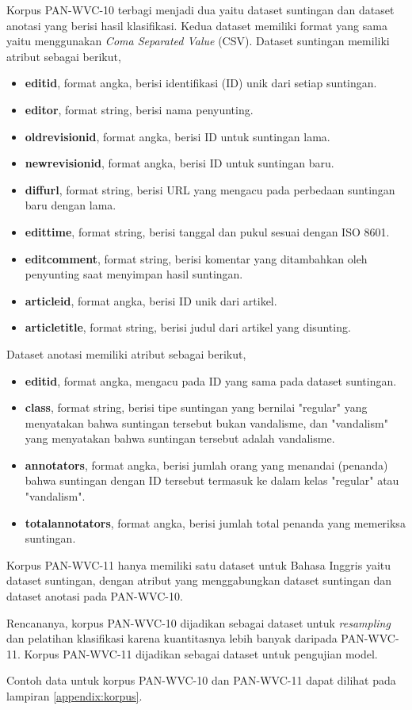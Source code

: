 Korpus PAN-WVC-10 terbagi menjadi dua yaitu dataset suntingan dan dataset anotasi yang berisi hasil klasifikasi.
Kedua dataset memiliki format yang sama yaitu menggunakan \textit{Coma Separated Value} (CSV).
Dataset suntingan memiliki atribut sebagai berikut,
\begin{itemize}
	\item \textbf{editid}, format angka, berisi identifikasi (ID) unik dari setiap suntingan.
	\item \textbf{editor}, format string, berisi nama penyunting.
	\item \textbf{oldrevisionid}, format angka, berisi ID untuk suntingan lama.
	\item \textbf{newrevisionid}, format angka, berisi ID untuk suntingan baru.
	\item \textbf{diffurl}, format string, berisi URL yang mengacu pada perbedaan suntingan baru dengan lama.
	\item \textbf{edittime}, format string, berisi tanggal dan pukul sesuai dengan ISO 8601.
	\item \textbf{editcomment}, format string, berisi komentar yang ditambahkan oleh penyunting saat menyimpan hasil suntingan.
	\item \textbf{articleid}, format angka, berisi ID unik dari artikel.
	\item \textbf{articletitle}, format string, berisi judul dari artikel yang disunting.
\end{itemize}

Dataset anotasi memiliki atribut sebagai berikut,
\begin{itemize}
	\item \textbf{editid}, format angka, mengacu pada ID yang sama pada dataset suntingan.
	\item \textbf{class}, format string, berisi tipe suntingan yang bernilai "regular" yang menyatakan bahwa suntingan tersebut bukan vandalisme, dan "vandalism" yang menyatakan bahwa suntingan tersebut adalah vandalisme.
	\item \textbf{annotators}, format angka, berisi jumlah orang yang menandai (penanda) bahwa suntingan dengan ID tersebut termasuk ke dalam kelas "regular" atau "vandalism".
	\item \textbf{totalannotators}, format angka, berisi jumlah total penanda yang memeriksa suntingan.
\end{itemize}

Korpus PAN-WVC-11 hanya memiliki satu dataset untuk Bahasa Inggris yaitu dataset suntingan, dengan atribut yang menggabungkan dataset suntingan dan dataset anotasi pada PAN-WVC-10.

Rencananya, korpus PAN-WVC-10 dijadikan sebagai dataset untuk \textit{resampling} dan pelatihan klasifikasi karena kuantitasnya lebih banyak daripada PAN-WVC-11.
Korpus PAN-WVC-11 dijadikan sebagai dataset untuk pengujian model.

Contoh data untuk korpus PAN-WVC-10 dan PAN-WVC-11 dapat dilihat pada lampiran \ref{appendix:korpus}.
